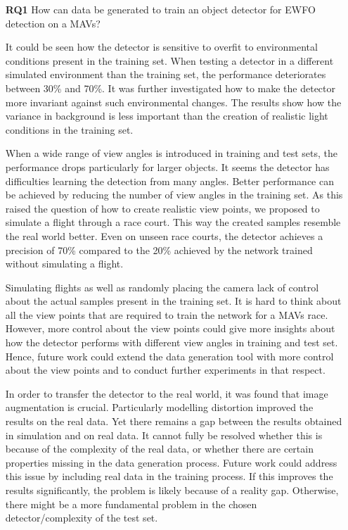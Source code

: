 \begin{enumerate}
	\item[\textbf{RQ1}]How can data be generated to train an object detector for \ac{EWFO} detection on a \acp{MAV}?
	
	It could be seen how the detector is sensitive to overfit to environmental conditions present in the training set. When testing a detector in a different simulated environment than the training set, the performance deteriorates between 30\% and 70\%. It was further investigated how to make the detector more invariant against such environmental changes. The results show how the variance in background is less important than the creation of realistic light conditions in the training set.
	
	When a wide range of view angles is introduced in training and test sets, the performance drops particularly for larger objects. It seems the detector has difficulties learning the detection from many angles. Better performance can be achieved by reducing the number of view angles in the training set. As this raised the question of how to create realistic view points, we proposed to simulate a flight through a race court. This way the created samples resemble the real world better. Even on unseen race courts, the detector achieves a precision of 70\% compared to the 20\% achieved by the network trained without simulating a flight. 
	
	Simulating flights as well as randomly placing the camera lack of control about the actual samples present in the training set. It is hard to think about all the view points that are required to train the network for a \acp{MAV} race. However, more control about the view points could give more insights about how the detector performs with different view angles in training and test set. Hence, future work could extend the data generation tool with more control about the view points and to conduct further experiments in that respect.
		
	In order to transfer the detector to the real world, it was found that image augmentation is crucial. Particularly modelling distortion improved the results on the real data. Yet there remains a gap between the results obtained in simulation and on real data. It cannot fully be resolved whether this is because of the complexity of the real data, or whether there are certain properties missing in the data generation process. Future work could address this issue by including real data in the training process. If this improves the results significantly, the problem is likely because of a reality gap. Otherwise, there might be a more fundamental problem in the chosen detector/complexity of the test set.
	

\end{enumerate}
